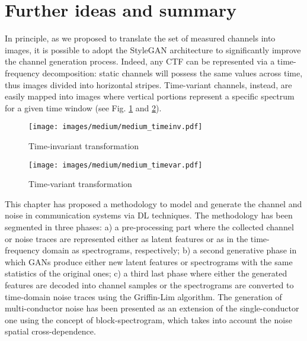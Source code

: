\section{Further ideas and summary}
\label{sec:stylegan_synthesis}
In principle, as we proposed to translate the set of measured channels into images, it is possible to adopt the StyleGAN architecture \cite{Karras2019} to significantly improve the channel generation process. Indeed, any CTF can be represented via a time-frequency decomposition: static channels will possess the same values across time, thus images divided into horizontal stripes. Time-variant channels, instead, are easily mapped into images where vertical portions represent a specific spectrum for a given time window (see Fig. \ref{fig:medium_timeinv} and \ref{fig:medium_timevar}).

\begin{figure}[t]
  \centering
	\texttt{[image: images/medium/medium\_timeinv.pdf]}
 	\caption{Time-invariant transformation}
	\label{fig:medium_timeinv}
\end{figure}%
\begin{figure}[t]
  \centering
	\texttt{[image: images/medium/medium\_timevar.pdf]}
 	\caption{Time-variant transformation}
	\label{fig:medium_timevar}
\end{figure}%

This chapter has proposed a methodology to model and generate the channel and noise in communication systems via DL techniques. The methodology has been segmented in three phases: a) a pre-processing part where the collected channel or noise traces are represented either as latent features or as in the time-frequency domain as spectrograms, respectively; b) a second generative phase in which GANs produce either new latent features or spectrograms with the same statistics of the original ones; c) a third last phase where either the generated features are decoded into channel samples or the spectrograms are converted to time-domain noise traces using the Griffin-Lim algorithm. 
The generation of multi-conductor noise has been presented as an extension of the single-conductor one using the concept of block-spectrogram, which takes into account the noise spatial cross-dependence.

